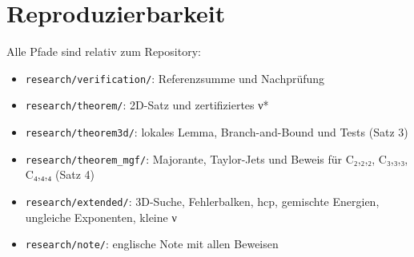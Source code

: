 \section{Reproduzierbarkeit}

Alle Pfade sind relativ zum Repository:

\begin{itemize}
\tightlist
\item
  \texttt{research/verification/}: Referenzsumme und Nachprüfung
\item
  \texttt{research/theorem/}: 2D-Satz und zertifiziertes ν*
\item
  \texttt{research/theorem3d/}: lokales Lemma, Branch-and-Bound und Tests (Satz 3)
\item
  \texttt{research/theorem\_mgf/}: Majorante, Taylor-Jets und Beweis für C₂,₂,₂, C₃,₃,₃, C₄,₄,₄ (Satz 4)
\item
  \texttt{research/extended/}: 3D-Suche, Fehlerbalken, hcp, gemischte Energien, ungleiche Exponenten, kleine ν
\item
  \texttt{research/note/}: englische Note mit allen Beweisen
\end{itemize}
